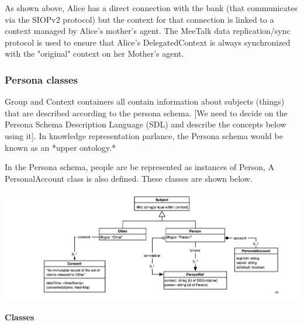 \documentclass[11pt, oneside]{article}   	%
\begin{document}
As shown above, Alice has a direct connection with the bank (that communicates via the SIOPv2 protocol) but the context for that connection is linked to a context managed by Alice's mother's agent. The MeeTalk data replication/sync protocol is used to ensure that Alice's DelegatedContext is always synchronized with the "original" context on her Mother's agent.

\subsubsection{Persona classes}

Group and Context containers all contain information about subjects (things) that are described according to the persona schema. [We need to decide on the Persona Schema Description Language (SDL) and describe the concepts below using it]. In knowledge representation parlance, the Persona schema would be known as an *upper ontology.*

In the Persona schema, people are be represented as instances of Person, A PersonalAccount class is also defined. These classes are shown below. 

\includegraphics[width=\textwidth]{./images/persona-classes.png}

\textbf{Classes}
\end{document}
